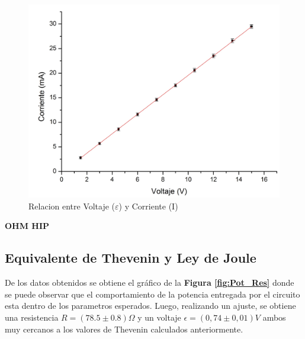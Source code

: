 \documentclass[11pt,a4paper]{article}
\begin{document}
\begin{figure}[h]
  \centering
  \includegraphics[scale=0.45]{Corriente_vs_Voltaje}
  \caption{Relacion entre Voltaje ($\varepsilon$) y Corriente (I)}
  \label{fig:Ohm_lin}
\end{figure}


\textbf{OHM HIP}


\subsection{Equivalente de Thevenin y Ley de Joule}

De los datos obtenidos se obtiene el gráfico de la \textbf{Figura \ref{fig:Pot_Res}} donde se puede observar que el comportamiento de la potencia entregada por el circuito esta dentro de los parametros esperados. Luego, realizando un ajuste, se obtiene una resistencia $R = (78.5 \pm 0.8)\Omega$ y un voltaje $\epsilon = (0,74\pm 0,01)V$ ambos muy cercanos a los valores de Thevenin calculados anteriormente.
\end{document}
